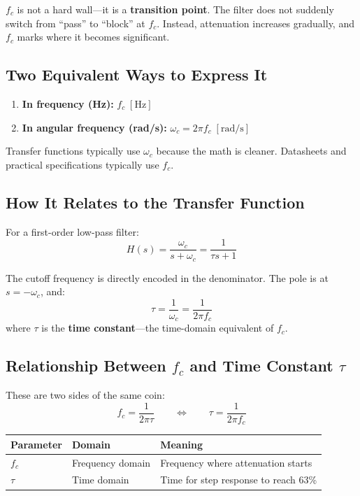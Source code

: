 \documentclass[12pt,a4paper]{article}
\begin{document}
$f_c$ is not a hard wall---it is a \textbf{transition point}. The filter does not suddenly switch from ``pass'' to ``block'' at $f_c$. Instead, attenuation increases gradually, and $f_c$ marks where it becomes significant.

\subsection{Two Equivalent Ways to Express It}

\begin{enumerate}
    \item \textbf{In frequency (Hz):} $f_c \;[\text{Hz}]$
    \item \textbf{In angular frequency (rad/s):} $\omega_c = 2\pi f_c \;[\text{rad/s}]$
\end{enumerate}

Transfer functions typically use $\omega_c$ because the math is cleaner. Datasheets and practical specifications typically use $f_c$.

\subsection{How It Relates to the Transfer Function}

For a first-order low-pass filter:
\begin{equation}
    H(s) = \frac{\omega_c}{s + \omega_c} = \frac{1}{\tau s + 1}
\end{equation}

The cutoff frequency is directly encoded in the denominator. The pole is at $s = -\omega_c$, and:
\begin{equation}
    \tau = \frac{1}{\omega_c} = \frac{1}{2\pi f_c}
\end{equation}
where $\tau$ is the \textbf{time constant}---the time-domain equivalent of $f_c$.

\subsection{Relationship Between $f_c$ and Time Constant $\tau$}

These are two sides of the same coin:
\begin{equation}
    f_c = \frac{1}{2\pi\tau} \qquad \Longleftrightarrow \qquad \tau = \frac{1}{2\pi f_c}
\end{equation}

\begin{center}
\begin{tabular}{lll}
    \toprule
    \textbf{Parameter} & \textbf{Domain} & \textbf{Meaning} \\
    \midrule
    $f_c$ & Frequency domain & Frequency where attenuation starts \\
    $\tau$ & Time domain & Time for step response to reach 63\% \\
    \bottomrule
\end{tabular}
\end{center}
\end{document}
